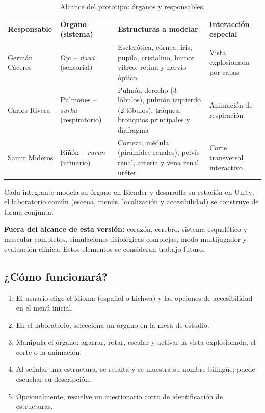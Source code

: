 \documentclass[11pt,a4paper]{article}
\begin{document}
\begin{table}[h]
\centering
\small
{}
\begin{tabularx}{\textwidth}{>{\raggedright}p{2.4cm} >{\raggedright}p{2.2cm} >{\raggedright\arraybackslash}X >{\raggedright\arraybackslash}p{3.4cm}}
\toprule
\textbf{Responsable} & \textbf{Órgano (sistema)} & \textbf{Estructuras a modelar} & \textbf{Interacción especial} \\
\midrule
Germán Cáceres & Ojo -- \emph{ñawi} (sensorial) & Esclerótica, córnea, iris, pupila, cristalino, humor vítreo, retina y nervio óptico & Vista explosionada por capas \\
Carlos Rivera & Pulmones -- \emph{surku} (respiratorio) & Pulmón derecho (3 lóbulos), pulmón izquierdo (2 lóbulos), tráquea, bronquios principales y diafragma & Animación de respiración \\
Samir Mideros & Riñón -- \emph{rurun} (urinario) & Corteza, médula (pirámides renales), pelvis renal, arteria y vena renal, uréter & Corte transversal interactivo \\
\bottomrule
\end{tabularx}
\caption{Alcance del prototipo: órganos y responsables.}
\end{table}

Cada integrante modela su órgano en Blender y desarrolla su estación en Unity; el laboratorio común (escena, menús, localización y accesibilidad) se construye de forma conjunta.

\textbf{Fuera del alcance de esta versión:} corazón, cerebro, sistema esquelético y muscular completos, simulaciones fisiológicas complejas, modo multijugador y evaluación clínica. Estos elementos se consideran trabajo futuro.

\subsection{¿Cómo funcionará?}
\begin{enumerate}
    \item El usuario elige el idioma (español o kichwa) y las opciones de accesibilidad en el menú inicial.
    \item En el laboratorio, selecciona un órgano en la mesa de estudio.
    \item Manipula el órgano: agarrar, rotar, escalar y activar la vista explosionada, el corte o la animación.
    \item Al señalar una estructura, se resalta y se muestra su nombre bilingüe; puede escuchar su descripción.
    \item Opcionalmente, resuelve un cuestionario corto de identificación de estructuras.
\end{enumerate}
\end{document}
